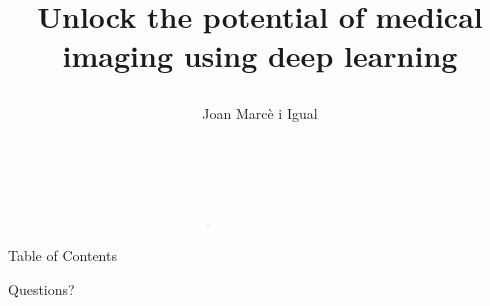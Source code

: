 \documentclass[xcolor={x11names, table}, compress]{beamer}
\begin{document}
{ 
    \begin{frame}
        \vspace{-1.5cm}
        \hfill{}
        \begin{flushleft}
            \hspace{-1cm}\includegraphics[width=0.8\textwidth, height=0.4em]{title_line.pdf}\hfill
            
            \title{
                \begin{flushleft}{\huge \color{BHKpresentationDark} 
                Unlock the potential of medical imaging using deep learning
            } 
            \end{flushleft}}
            
            \date{$~~$}
            \author[Joan]{\begin{flushleft}\vspace{-1cm} Joan Marcè i Igual\end{flushleft}}
            \titlepage
        \end{flushleft}
    \end{frame}
}

\begin{frame}[allowframebreaks]{Table of Contents}
\tableofcontents
\end{frame}

 





\begin{frame}
    \begin{center}
        Questions?
    \end{center}
\end{frame}
\end{document}
